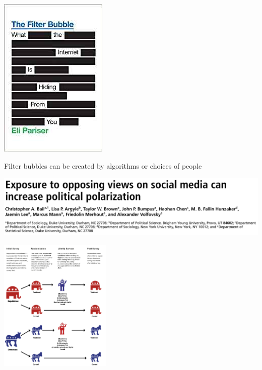 \documentclass[aspectratio=169]{beamer}
\begin{document}
\begin{frame}

\begin{center}
\includegraphics[height=0.85\textheight]{figures/pariser_filter_2011_cover}
\end{center}

Filter bubbles can be created by algorithms or choices of people


\end{frame}
\begin{frame}

\begin{center}
\includegraphics[width=\textwidth]{figures/bail_exposure_2018_title}
\end{center}

\end{frame}
\begin{frame}

\begin{center}
\includegraphics[width=0.4\textwidth]{figures/bail_exposure_2018_fig1}
\end{center}

\end{frame}
\end{document}

